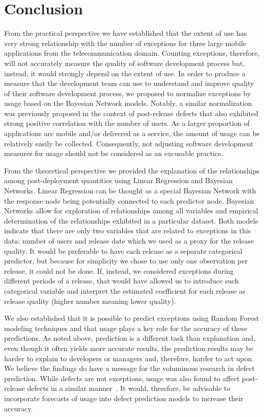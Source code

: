\documentclass[smallextended]{svjour3}       %
\begin{document}
\section{Conclusion}\label{s:conclusion}

From the practical perspective we have established
that the extent of use has very strong relationship with the number
of exceptions for three large mobile applications from 
the telecommunication domain. Counting exceptions,
therefore, will not accurately measure the quality of software
development process but, instead, it would strongly depend on the
extent of use. In order to produce a measure that the development
team can use to understand and improve quality of their software
development process, we proposed to normalize exceptions by usage
based on the Bayesian Network models. Notably, a similar
normalization was previously proposed in the context of post-release
defects that also exhibited strong positive correlation with the
number of users.  As a larger proportion of applications are mobile
and/or delivered as a service, the amount of usage can be relatively
easily be collected.  Consequently, not adjusting software
development measures for usage should not be considered as an
excusable practice.

From the theoretical perspective we provided the explanation of the
relationships among post-deployment quantities using Linear
Regression and Bayesian Networks. Linear Regression can be thought
as a special Bayesian Network with the response node being
potentially connected to each predictor node. Bayesian Networks
allow for exploration of relationships among all variables and
empirical determination of the relationships exhibited in a
particular dataset.  Both models indicate that there are only two
variables that are related to exceptions in this data: number of
users and release date which we used as a proxy for the release
quality. It would be preferable to have each release as a separate
categorical predictor, but because for simplicity we chose to use
only one observation per release, it could not be done. If, instead,
we considered exceptions during different periods of a release, that
would have allowed us to introduce such categorical variable and
interpret the estimated coefficient for each release as release
quality (higher number meaning lower quality).

We also established
that it is possible to predict exceptions using Random Forest
modeling techniques and that usage plays a key role for the accuracy
of these predictions. As noted above, prediction is a different task
than explanation and, even though it often yields more accurate
results, the prediction results may be harder to explain to
developers or managers and, therefore, harder to act upon. We
believe the findings do have a message for the voluminous research
in defect prediction. While defects are not exceptions, usage was
also found to affect post-release defects in a similar
manner~\cite{caper,hmps15,mockus2005predictors}. It would, therefore, be advisable to 
incorporate forecasts of usage into defect prediction models  to increase their accuracy.
\end{document}
